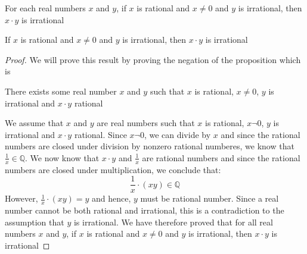 \newpage
\begin{example}
For each real numbers $x$ and $y$, if $x$ is rational and $x \neq 0$ and $y$ is irrational, then $x \cdot y$ is irrational
\begin{tcolorbox}
	\begin{theorem}
	\label{the2}		
		If $x$ is rational and $x \neq 0$ and $y$ is irrational, then $x \cdot y$ is irrational
	\end{theorem}
\end{tcolorbox}

\begin{proof}

We will prove this result by proving the negation of the proposition which is
	\begin{center}
		There exists some real number $x$ and $y$ such that $x$ is rational, $x \neq 0$, $y$ is irrational and $x \cdot y$ rational
	\end{center}

We assume that $x$ and $y$ are real numbers such that $x$ is rational, $x \neg 0$, $y$ is irrational and $x \cdot y$ rational. Since $x \neg 0$, we can divide by $x$ and since the rational numbers are closed under division by nonzero rational numberes, we know that $\frac{1}{x} \in \mathbb{Q}$. We now know that $x \cdot y$ and $\frac{1}{x}$ are rational numbers and since the rational numbers are closed under multiplication, we conclude that: 
	\begin{equation}
		\frac{1}{x} \cdot (xy) \in \mathbb{Q}
	\end{equation}
However, $\frac{1}{x} \cdot (xy) = y$ and hence, $y$ must be rational number. Since a real number cannot be both rational and irrational, this is a contradiction to the assumption that $y$ is irrational. We have therefore proved that for all real numbers $x$ and $y$, if $x$ is rational and $x \neq 0$ and $y$ is irrational, then $x \cdot y$ is irrational

\end{proof}
\end{example}



